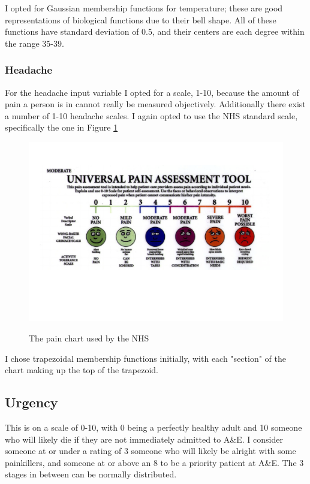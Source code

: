 \documentclass[12pt, a4paper]{report}
\begin{document}
\par

I opted for Gaussian membership functions for temperature; these are good representations of biological functions due to their bell shape.
All of these functions have standard deviation of 0.5, and their centers are each degree within the range 35-39.

\subsubsection{Headache}

For the headache input variable I opted for a scale, 1-10, because the amount of pain a person is in cannot really be measured objectively.
Additionally there exist a number of 1-10 headache scales.
I again opted to use the NHS standard scale, specifically the one in Figure \ref{fig:painscale}

\begin{figure}[ht]
  \centering
  \caption{The pain chart used by the NHS}
  \includegraphics[width=\textwidth]{Report/Images/faces_scale_tool.png}
  \label{fig:painscale}
\end{figure}

\par

I chose trapezoidal membership functions initially, with each "section" of the chart making up the top of the trapezoid.

\subsection{Urgency}

This is on a scale of 0-10, with 0 being a perfectly healthy adult and 10 someone who will likely die if they are not immediately admitted to A\&E.
I consider someone at or under a rating of 3 someone who will likely be alright with some painkillers, and someone at or above an 8 to be a priority patient at A\&E. The 3 stages in between can be normally distributed.
\end{document}
